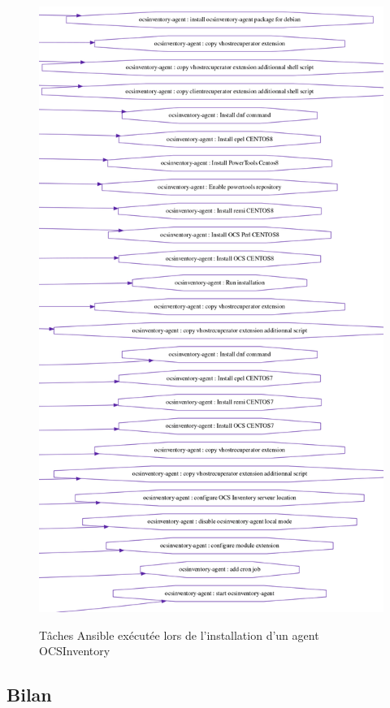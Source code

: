 \documentclass[12pt, a4paper, twoside]{article}
\begin{document}
\begin{figure}[!ht]
    \centering
    \includegraphics[scale=0.43]{src/graph_roles_ocs.png}
    \label{fig:graph_roles_ocs.png}
    \caption{Tâches \gls{Ansible} exécutée lors de l'installation d'un agent \gls{OCSInventory}}
\end{figure}

\newpage
\subsection{Bilan}
\end{document}
